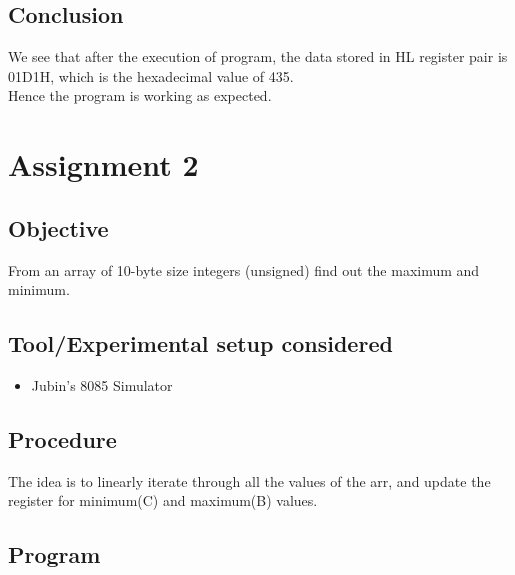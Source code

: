 \documentclass[a4paper]{article} %
\begin{document}
    \subsection{Conclusion}
        We see that after the execution of program, the data stored in HL register pair is 01D1H, which is the hexadecimal value of 435.\\
        Hence the program is working as expected.
\newpage

\section[Find minimum and maximum number in 10-byte unsigned array]{Assignment 2} %
    \subsection{Objective}
        From an array of 10-byte size integers (unsigned) find out the maximum and minimum.
    \subsection{Tool/Experimental setup considered}
        \begin{itemize}
            \item Jubin's 8085 Simulator
        \end{itemize}
    \subsection{Procedure}
        The idea is to linearly iterate through all the values of the arr, and update the register for minimum(C) and maximum(B) values.
    \subsection{Program}
        
\end{document}
